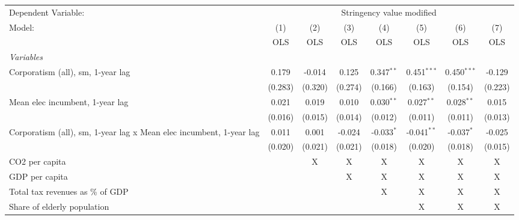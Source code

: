 
\begingroup
\centering
\begin{tabular}{lccccccc}
   \toprule
   Dependent Variable: & \multicolumn{7}{c}{Stringency value modified}\\
   Model:                                                              & (1)     & (2)     & (3)     & (4)          & (5)           & (6)           & (7)\\  
                                                                       &  OLS    & OLS     & OLS     & OLS          & OLS           & OLS           & OLS\\  
   \midrule
   \emph{Variables}\\
   Corporatism (all), sm, 1-year lag                                   & 0.179   & -0.014  & 0.125   & 0.347$^{**}$ & 0.451$^{***}$ & 0.450$^{***}$ & -0.129\\   
                                                                       & (0.283) & (0.320) & (0.274) & (0.166)      & (0.163)       & (0.154)       & (0.223)\\   
   Mean elec incumbent, 1-year lag                                     & 0.021   & 0.019   & 0.010   & 0.030$^{**}$ & 0.027$^{**}$  & 0.028$^{**}$  & 0.015\\   
                                                                       & (0.016) & (0.015) & (0.014) & (0.012)      & (0.011)       & (0.011)       & (0.013)\\   
   Corporatism (all), sm, 1-year lag x Mean elec incumbent, 1-year lag & 0.011   & 0.001   & -0.024  & -0.033$^{*}$ & -0.041$^{**}$ & -0.037$^{*}$  & -0.025\\   
                                                                       & (0.020) & (0.021) & (0.021) & (0.018)      & (0.020)       & (0.018)       & (0.015)\\   
   CO2 per capita                                                      &         & X       & X       & X            & X             & X             & X\\  
   GDP per capita                                                      &         &         & X       & X            & X             & X             & X\\  
   Total tax revenues as \% of GDP                                     &         &         &         & X            & X             & X             & X\\  
   Share of elderly population                                         &         &         &         &              & X             & X             & X\\  

\end{tabular}
